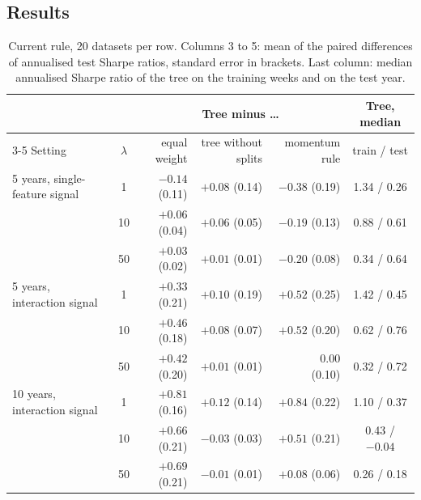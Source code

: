 \documentclass[11pt,a4paper]{article}
\newcommand{\1}{\mathbf{1}}
\begin{document}
\subsection{Results}
\begin{table}[H]
\centering\small\setlength{\tabcolsep}{4pt}
\begin{tabular}{@{}l c rrr c@{}}
\toprule
 & & \multicolumn{3}{c}{Tree minus \dots} & Tree, median\\
\cmidrule(lr){3-5}
Setting & $\lambda$ & equal weight & tree without splits & momentum rule & train / test\\
\midrule
5 years, single-feature signal & 1 & $-0.14$ (0.11) & $+0.08$ (0.14) & $-0.38$ (0.19) & 1.34 / 0.26\\
 & 10 & $+0.06$ (0.04) & $+0.06$ (0.05) & $-0.19$ (0.13) & 0.88 / 0.61\\
 & 50 & $+0.03$ (0.02) & $+0.01$ (0.01) & $-0.20$ (0.08) & 0.34 / 0.64\\
5 years, interaction signal & 1 & $+0.33$ (0.21) & $+0.10$ (0.19) & $+0.52$ (0.25) & 1.42 / 0.45\\
 & 10 & $+0.46$ (0.18) & $+0.08$ (0.07) & $+0.52$ (0.20) & 0.62 / 0.76\\
 & 50 & $+0.42$ (0.20) & $+0.01$ (0.01) & $\phantom{+}0.00$ (0.10) & 0.32 / 0.72\\
10 years, interaction signal & 1 & $+0.81$ (0.16) & $+0.12$ (0.14) & $+0.84$ (0.22) & 1.10 / 0.37\\
 & 10 & $+0.66$ (0.21) & $-0.03$ (0.03) & $+0.51$ (0.21) & 0.43 / $-0.04$\\
 & 50 & $+0.69$ (0.21) & $-0.01$ (0.01) & $+0.08$ (0.06) & 0.26 / 0.18\\
\bottomrule
\end{tabular}
\caption{Current rule, 20 datasets per row. Columns 3 to 5: mean of the paired differences of annualised test Sharpe ratios, standard error in brackets. Last column: median annualised Sharpe ratio of the tree on the training weeks and on the test year.}
\label{tab:lambda}
\end{table}
\end{document}
